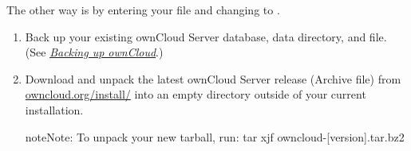 \documentclass[letterpaper,10pt,english]{sphinxmanual}
\begin{document}
The other way is by entering your  file and changing
 to .
\begin{enumerate}
\item {} 
Back up your existing ownCloud Server database, data directory, and
 file. (See {\hyperref[maintenance/backup::doc]{\emph{Backing up ownCloud}}}.)

\item {} 
Download and unpack the latest ownCloud Server release (Archive file) from
\href{https://owncloud.org/install/}{owncloud.org/install/} into an empty directory outside
of your current installation.

\begin{notice}{note}{Note:}
To unpack your new tarball, run:
tar xjf owncloud-{[}version{]}.tar.bz2
\end{notice}

\end{enumerate}
\end{document}
